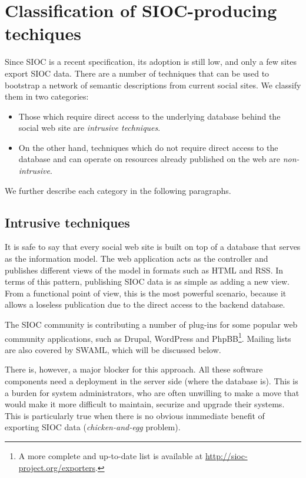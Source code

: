 \documentclass{../templates/www2008-submission}
\begin{document}
\section{Classification of SIOC-producing techiques}

Since SIOC is a recent specification, its adoption is still low, and
only a few sites export SIOC data. There are a number of techniques
that can be used to bootstrap a network of semantic descriptions from
current social sites. We classify them in two categories:

\begin{itemize}
\item Those which require direct access to the underlying database behind
the social web site are \emph{intrusive techniques}.
\item On the other hand, techniques which do not require direct access to
the database and can operate on resources already published on the web
are \emph{non-intrusive}.
\end{itemize}

We further describe each category in the following paragraphs.

\subsection{Intrusive techniques}

It is safe to say that every social web site is built on top of a
database that serves as the information model. The web application
acts as the controller and publishes different views of the model in
formats such as HTML and RSS. In terms of this pattern, publishing
SIOC data is as simple as adding a new view.
From a functional point of view, this is the most powerful scenario, because
it allows a loseless publication due to the direct access
to the backend database.

The SIOC community is contributing a number of plug-ins for some
popular web community applications, such as Drupal, WordPress and 
PhpBB\footnote{A more complete and up-to-date list is available
at \url{http://sioc-project.org/exporters}.}. Mailing lists are
also covered by SWAML, which will be discussed below.

There is, however, a major blocker for this approach. All these
software components need a deployment in the server side (where
the database is). This is a burden for system administrators, who
are often unwilling to make a move that would make it more difficult to
maintain, securize and upgrade their systems. This is particularly
true when there is no obvious inmmediate benefit of exporting
SIOC data (\emph{chicken-and-egg} problem).
\end{document}

